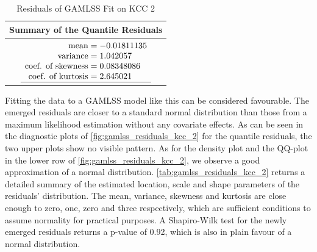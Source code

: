 \begin{table}[H]
\centering
\begin{tabular}{c}
\hline
\rowcolor{white} 
\textbf{Summary of the Quantile Residuals} \\ \hline\hline
 $\begin{array}[t]{ r @{{}={}} l }
\text{mean} & -0.01811135                         \\ 
\text{variance} & 1.042057                        \\ 
\text{coef. of skewness} & 0.08348086             \\ 
\text{coef. of kurtosis} & 2.645021               \\ \hline
\end{array}$
\end{tabular}
\caption{Residuals of GAMLSS Fit on KCC 2}
\label{tab:gamlss_residuals_kcc_2}
\end{table}



Fitting the data to a \ac{GAMLSS} model like this can be considered favourable. The emerged residuals are closer to a standard normal distribution than those from a maximum likelihood estimation without any covariate effects. As can be seen in the diagnostic plots of \autoref{fig:gamlss_residuals_kcc_2} for the quantile residuals, the two upper plots show no visible pattern. As for the density plot and the QQ-plot in the lower row of \autoref{fig:gamlss_residuals_kcc_2}, we observe a good approximation of a normal distribution. \autoref{tab:gamlss_residuals_kcc_2} returns a detailed summary of the estimated location, scale and shape parameters of the residuals' distribution. The mean, variance, skewness and kurtosis are close enough to zero, one, zero and three respectively, which are sufficient conditions to assume normality for practical purposes. A Shapiro-Wilk test for the newly emerged residuals returns a p-value of 0.92, which is also in plain favour of a normal distribution.
\\


